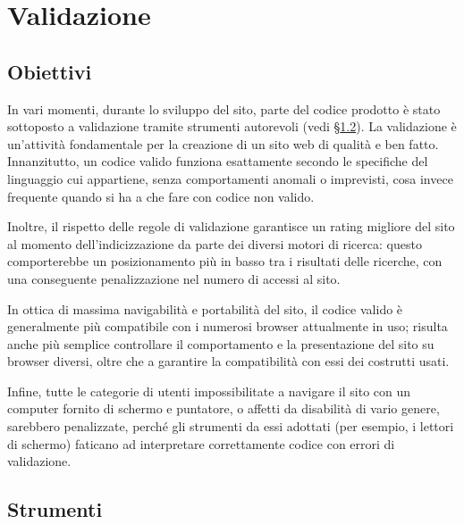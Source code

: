 \section{Validazione}
\label{validazione}

\subsection{Obiettivi}
\label{validazione-obiettivi}

In vari momenti, durante lo sviluppo del sito, parte del codice prodotto è stato sottoposto a validazione tramite strumenti autorevoli (vedi §\ref{validazione-strumenti}). La validazione è un'attività fondamentale per la creazione di un sito web di qualità e ben fatto. Innanzitutto, un codice valido funziona esattamente secondo le specifiche del linguaggio cui appartiene, senza comportamenti anomali o imprevisti, cosa invece frequente quando si ha a che fare con codice non valido. 

Inoltre, il rispetto delle regole di validazione garantisce un rating migliore del sito al momento dell'indicizzazione da parte dei diversi motori di ricerca: questo comporterebbe un posizionamento più in basso tra i risultati delle ricerche, con una conseguente penalizzazione nel numero di accessi al sito.

In ottica di massima navigabilità e portabilità del sito, il codice valido è generalmente più compatibile con i numerosi browser attualmente in uso; risulta anche più semplice controllare il comportamento e la presentazione del sito su browser diversi, oltre che a garantire la compatibilità con essi dei costrutti usati.

Infine, tutte le categorie di utenti impossibilitate a navigare il sito con un computer fornito di schermo e puntatore, o affetti da disabilità di vario genere, sarebbero penalizzate, perché gli strumenti da essi adottati (per esempio, i lettori di schermo) faticano ad interpretare correttamente codice con errori di validazione.


\subsection{Strumenti}
\label{validazione-strumenti}

